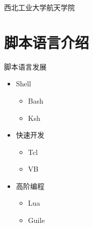 

\def\lecturename{嵌入式技术}

\title{\insertlecture}

\author{邢超}

\institute
{
  西北工业大学航天学院
}


\subtitle{脚本语言程序设计}
\date{2015}



\begin{frame}
  \maketitle
\end{frame}


\section{脚本语言介绍}
\begin{frame}{脚本语言发展}
\begin{itemize}
\item Shell
\begin{itemize}
\item Bash
\item Ksh
\end{itemize}
\item 快速开发
\begin{itemize}
\item Tcl
\item VB
\end{itemize}
\item 高阶编程
\begin{itemize}
\item Lua
\item Guile
\end{itemize}
\end{itemize}
\end{frame}



